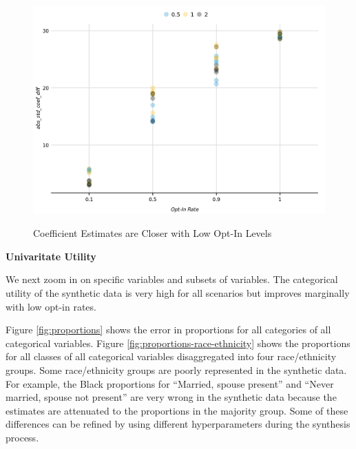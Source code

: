 \documentclass[
]{urban-formatting}
\begin{document}
\begin{figure}[!htb]
    \caption{Coefficient Estimates are Closer with Low Opt-In Levels}
    \centering
    \includegraphics[width=6.5in]{../analysis/figures/regression-overlap-1.png}
    \label{fig:regression}
\end{figure}

\textbf{Univaritate Utility}

We next zoom in on specific variables and subsets of variables. The
categorical utility of the synthetic data is very high for all scenarios
but improves marginally with low opt-in rates.

Figure \ref{fig:proportions} shows the error in proportions for all
categories of all categorical variables. Figure
\ref{fig:proportions-race-ethnicity} shows the proportions for all
classes of all categorical variables disaggregated into four
race/ethnicity groups. Some race/ethnicity groups are poorly represented
in the synthetic data. For example, the Black proportions for ``Married,
spouse present'' and ``Never married, spouse not present'' are very
wrong in the synthetic data because the estimates are attenuated to the
proportions in the majority group. Some of these differences can be
refined by using different hyperparameters during the synthesis process.
\end{document}
